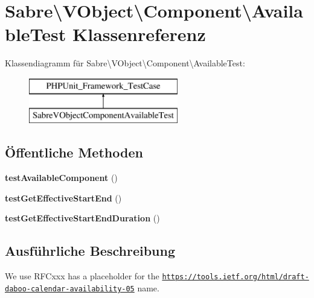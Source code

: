 \hypertarget{class_sabre_1_1_v_object_1_1_component_1_1_available_test}{}\section{Sabre\textbackslash{}V\+Object\textbackslash{}Component\textbackslash{}Available\+Test Klassenreferenz}
\label{class_sabre_1_1_v_object_1_1_component_1_1_available_test}
Klassendiagramm für Sabre\textbackslash{}V\+Object\textbackslash{}Component\textbackslash{}Available\+Test\+:\begin{figure}[H]
\begin{center}
\leavevmode
\includegraphics[height=2.000000cm]{class_sabre_1_1_v_object_1_1_component_1_1_available_test}
\end{center}
\end{figure}
\subsection*{Öffentliche Methoden}
\begin{DoxyCompactItemize}
\item 
\mbox{\label{class_sabre_1_1_v_object_1_1_component_1_1_available_test_a111315d86f24408dc40f0af036d3be14}} 
{\bfseries test\+Available\+Component} ()
\item 
\mbox{\label{class_sabre_1_1_v_object_1_1_component_1_1_available_test_a786710a499d8594296474e1bc264a8b7}} 
{\bfseries test\+Get\+Effective\+Start\+End} ()
\item 
\mbox{\label{class_sabre_1_1_v_object_1_1_component_1_1_available_test_ae521dff821374f8cb72d71e81e541298}} 
{\bfseries test\+Get\+Effective\+Start\+End\+Duration} ()
\end{DoxyCompactItemize}


\subsection{Ausführliche Beschreibung}
We use {\ttfamily R\+F\+Cxxx} has a placeholder for the \href{https://tools.ietf.org/html/draft-daboo-calendar-availability-05}{\tt https\+://tools.\+ietf.\+org/html/draft-\/daboo-\/calendar-\/availability-\/05} name. 

